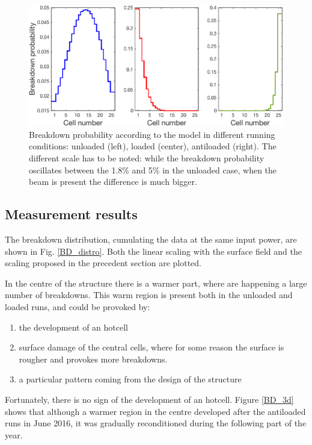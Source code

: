 \begin{figure}[h]
\centering 
\includegraphics[scale=0.45]{pictures/BD_probability.png}
\caption{Breakdown probability according to the model in different running conditions: unloaded (left), loaded (center), antiloaded (right). The different scale has to be noted: while the breakdown probability oscillates between the 1.8\% and 5\% in the unloaded case, when the beam is present the difference is much bigger.}
\label{BD_prob}
\end{figure}


\subsection[Measurement results]{Measurement results}

The breakdown distribution, cumulating the data at the same input power, are shown in Fig. \ref{BD_distro}. Both the linear scaling with the surface field and the scaling proposed in the precedent section are plotted.

In the centre of the structure there is a warmer part, where are happening a large number of breakdowns. This warm region is present both in the unloaded and loaded runs, and could be provoked by: 
\begin{enumerate}
\item the development of an hotcell
\item surface damage of the central cells, where for some reason the surface is rougher and provokes more breakdowns. 
\item a particular pattern coming from the design of the structure
\end{enumerate}
Fortunately, there is no sign of the development of an hotcell. Figure \ref{BD_3d} shows that although a warmer region in the centre developed after the antiloaded runs in June 2016, it was gradually reconditioned during the following part of the year. 

